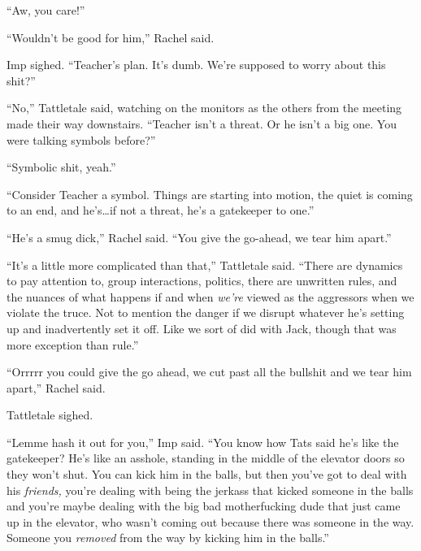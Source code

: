 ``Aw, you care!''



``Wouldn't be good for him,'' Rachel said.



Imp sighed.  ``Teacher's plan.  It's dumb.  We're supposed to worry about this shit?''



``No,'' Tattletale said, watching on the monitors as the others from the meeting made their way downstairs.  ``Teacher isn't a threat.  Or he isn't a big one.  You were talking symbols before?''



``Symbolic shit, yeah.''



``Consider Teacher a symbol.  Things are starting into motion, the quiet is coming to an end, and he's\ldots if not a threat, he's a gatekeeper to one.''



``He's a smug dick,'' Rachel said.  ``You give the go-ahead, we tear him apart.''



``It's a little more complicated than that,'' Tattletale said.  ``There are dynamics to pay attention to, group interactions, politics, there are unwritten rules, and the nuances of what happens if and when \emph{we're} viewed as the aggressors when we violate the truce.  Not to mention the danger if we disrupt whatever he's setting up and inadvertently set it off.  Like we sort of did with Jack, though that was more exception than rule.''



``Orrrrr you could give the go ahead, we cut past all the bullshit and we tear him apart,'' Rachel said.



Tattletale sighed.



``Lemme hash it out for you,'' Imp said.  ``You know how Tats said he's like the gatekeeper?  He's like an asshole, standing in the middle of the elevator doors so they won't shut.  You can kick him in the balls, but then you've got to deal with his \emph{friends,} you're dealing with being the jerkass that kicked someone in the balls and you're maybe dealing with the big bad motherfucking dude that just came up in the elevator, who wasn't coming out because there was someone in the way.  Someone you \emph{removed} from the way by kicking him in the balls.''



